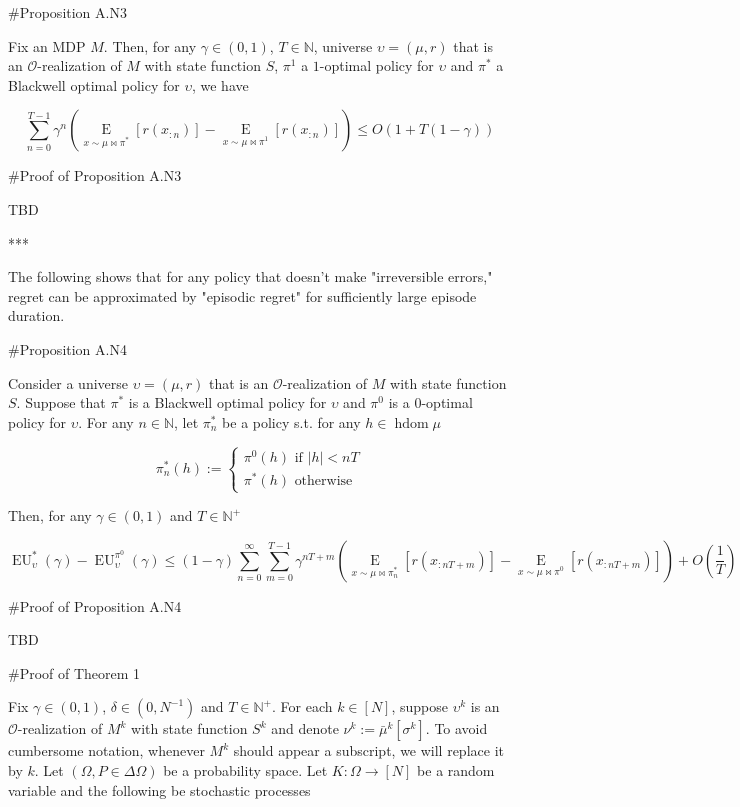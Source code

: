 \documentclass[a4paper]{article}
\newcommand{\Comment}[1]{}
\newcommand{\E}[1]{\underset{#1}{\operatorname{E}}}
\newcommand{\Nats}{\mathbb{N}}
\newcommand{\Abs}[1]{\lvert #1 \rvert}
\newcommand{\Ob}{\mathcal{O}}
\DeclareMathOperator{\HD}{hdom}
\newcommand{\EU}{\operatorname{EU}}
\newcommand{\F}{\mathcal{F}}
\begin{document}
\#Proposition A.N3

Fix an MDP $M$. Then, for any $\gamma\in(0,1)$, $T \in \Nats$, universe $\upsilon=(\mu,r)$ that is an $\Ob$-realization of $M$ with state function $S$, $\pi^1$ a $1$-optimal policy for $\upsilon$ and $\pi^*$ a Blackwell optimal policy for $\upsilon$, we have

$$\sum_{n=0}^{T-1} \gamma^n \left(\E{x \sim \mu\bowtie\pi^*}\left[r\left(x_{:n}\right)\right]-\E{x \sim \mu\bowtie\pi^1}\left[r\left(x_{:n}\right)\right]\right) \leq O\left(1+T\left(1-\gamma\right)\right)$$

\#Proof of Proposition A.N3

TBD

***

The following shows that for any policy that doesn't make "irreversible errors," regret can be approximated by "episodic regret" for sufficiently large episode duration.

\#Proposition A.N4

Consider a universe $\upsilon=(\mu,r)$ that is an $\Ob$-realization of $M$ with state function $S$. Suppose that $\pi^*$ is a Blackwell optimal policy for $\upsilon$ and $\pi^0$ is a $0$-optimal policy for $\upsilon$. For any $n \in \Nats$, let $\pi^*_n$ be a policy s.t. for any $h \in \HD{\mu}$

$$\pi^*_n(h):=\begin{cases} \pi^0(h) \text{ if } \Abs{h} < nT \\ \pi^*(h) \text{ otherwise} \end{cases}$$

Then, for any $\gamma\in(0,1)$ and $T \in \Nats^+$

$$\EU^*_\upsilon(\gamma)-\EU^{\pi^0}_\upsilon(\gamma) \leq (1-\gamma)\sum_{n=0}^\infty \sum_{m=0}^{T-1} \gamma^{nT+m}\left(\E{x\sim\mu\bowtie\pi^*_n}\left[r\left(x_{:nT+m}\right)\right]-\E{x\sim\mu\bowtie\pi^0}\left[r\left(x_{:nT+m}\right)\right]\right) + O\left(\frac{1}{T}\right)$$

\#Proof of Proposition A.N4

TBD

\#Proof of Theorem 1

Fix $\gamma \in (0,1)$, $\delta\in\left(0,N^{-1}\right)$ and $T \in \Nats^+$. For each $k \in [N]$, suppose $\upsilon^k$ is an $\Ob$-realization of $M^k$ with state function $S^k$ and denote $\nu^k:=\bar{\mu}^k\left[\sigma^k\right]$. To avoid cumbersome notation, whenever $M^k$ should appear a subscript, we will replace it by $k$. Let $(\Omega,P \in \Delta\Omega)$ be a probability space\Comment{ and $\{\F_n \subseteq 2^\Omega\}_{n \in \Nats \sqcup \{-1\}}$ a filtration of $\Omega$}. Let $K: \Omega \rightarrow [N]$ be \Comment{measurable w.r.t. $\F_{-1}$}a random variable and the following be stochastic processes\Comment{ adapted to $\F$}
\end{document}
